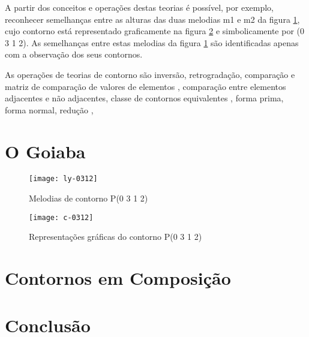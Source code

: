 \documentclass{sciposter}
\begin{document}
\begin{multicols}{3}
A partir dos conceitos e operações destas teorias é possível, por
exemplo, reconhecer semelhanças entre as alturas das duas melodias m1
e m2 da figura \ref{fig:ly-0312}, cujo contorno está representado
graficamente na figura \ref{fig:cseg-0312} e simbolicamente por (0 3 1
2).  As semelhanças entre estas melodias da figura \ref{fig:ly-0312}
são identificadas apenas com a observação dos seus contornos.

As operações de teorias de contorno são inversão, retrogradação,
comparação e matriz de comparação de valores de elementos
\cite{morris87:composition}, comparação entre elementos adjacentes e
não adjacentes, classe de contornos equivalentes
\cite{marvin.ea87:relating}, forma prima, forma normal, redução
\cite{adams76:melodic},

\section{O Goiaba}

\end{multicols}

\begin{center}

\begin{multicols}{2}

  \begin{figure}
    \centering
    \texttt{[image: ly-0312]}
    \caption{Melodias de contorno P(0 3 1 2)}
    \label{fig:ly-0312}
  \end{figure}

  \begin{figure}
    \centering
    \texttt{[image: c-0312]}
    \caption{Representações gráficas do contorno P(0 3 1 2)}
    \label{fig:cseg-0312}
  \end{figure}
  
\end{multicols}

\end{center}

\begin{multicols}{3}

\section{Contornos em Composição}

\section{Conclusão}

\renewcommand{\refname}{Bibliografia}



\end{multicols}
\end{document}
